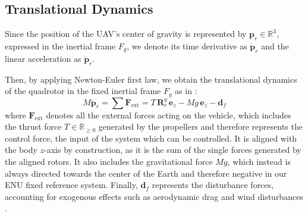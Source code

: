 \subsection{Translational Dynamics}
Since the position of the UAV's center of gravity is represented by \( \mathbf{p}_r \in \mathbb{R}^3 \), 
expressed in the inertial frame \( F_g \), we denote its time derivative as \( \dot{\mathbf{p}}_r \) and 
the linear acceleration as \( \ddot{\mathbf{p}}_r \).


Then, by applying Newton-Euler first law, we obtain the 
translational dynamics of the quadrotor in the fixed inertial frame $F_g$ as in \cite{simplified_model}:
\begin{equation}
M \ddot{\mathbf{p}}_r = \sum \mathbf{F}_{\text{ext}} 
= T \, \mathbf{R}_r^g \, \mathbf{e}_z - M g \, \mathbf{e}_z - \mathbf{d}_f
\label{eq:translational_dyn}
\end{equation}
where \( \mathbf{F}_{\text{ext}} \) denotes all the external forces acting on the vehicle, which
includes the thrust force \( T \in \mathbb{R}_{\geq 0} \) generated by the propellers and therefore  
represents the control force, the input of the system which can be controlled.
It is aligned with the body \( z \)-axis by construction, as it is the sum of the single
forces generated by the aligned rotors. 
It also includes the gravitational force \( M g \), which instead is always directed towards the center of 
the Earth and therefore negative in our ENU fixed reference system. 
Finally, \( \mathbf{d}_f \) represents the disturbance forces, accounting for exogenous effects such as 
aerodynamic drag and wind disturbances \cite{control_quadrotor_main}.


